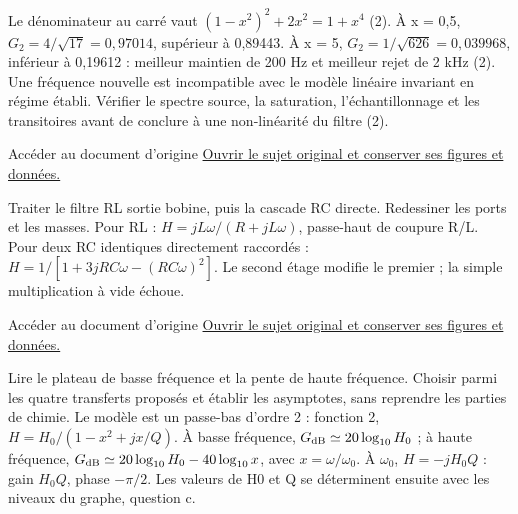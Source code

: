 Le dénominateur au carré vaut $(1-x^2)^2+2x^2=1+x^4$ (2). À x = 0,5, $G_2=4/\sqrt{17}=0{,}97014$, supérieur à 0,89443. À x = 5, $G_2=1/\sqrt{626}=0{,}039968$, inférieur à 0,19612 : meilleur maintien de 200 Hz et meilleur rejet de 2 kHz (2). Une fréquence nouvelle est incompatible avec le modèle linéaire invariant en régime établi. Vérifier le spectre source, la saturation, l’échantillonnage et les transitoires avant de conclure à une non-linéarité du filtre (2).


\begin{loi}{Accéder au document d’origine}
\href{https://mpsi.schleck.ovh/fichiers/td/td7_filtrage_lineaire.pdf}{Ouvrir le sujet original et conserver ses figures et données.}
\end{loi}
Traiter le filtre RL sortie bobine, puis la cascade RC directe. Redessiner les ports et les masses.
Pour RL : $H=jL\omega/(R+jL\omega)$, passe-haut de coupure R/L. Pour deux RC identiques directement raccordés : $H=1/[1+3jRC\omega-(RC\omega)^2]$. Le second étage modifie le premier ; la simple multiplication à vide échoue.

\begin{loi}{Accéder au document d’origine}
\href{https://mpsi.schleck.ovh/fichiers/devoirs/2025-2026/ds04_enonce.pdf}{Ouvrir le sujet original et conserver ses figures et données.}
\end{loi}
Lire le plateau de basse fréquence et la pente de haute fréquence. Choisir parmi les quatre transferts proposés et établir les asymptotes, sans reprendre les parties de chimie.
Le modèle est un passe-bas d’ordre 2 : fonction 2, $H=H_0/(1-x^2+jx/Q)$. À basse fréquence, $G_{\rm dB}\simeq20\log_{10}H_0$ ; à haute fréquence, $G_{\rm dB}\simeq20\log_{10}H_0-40\log_{10}x$, avec $x=\omega/\omega_0$. À $\omega_0$, $H=-jH_0Q$ : gain $H_0Q$, phase $-\pi/2$. Les valeurs de H0 et Q se déterminent ensuite avec les niveaux du graphe, question c.

